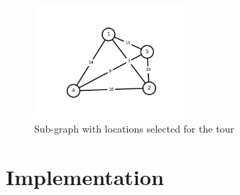 \documentclass{article}
\begin{document}
\begin{figure}[h]
  \centering
  \includegraphics[width=0.50\textwidth]{img/graphOutput.png}
  \caption{Sub-graph with locations selected for the tour}\label{fig:graphOutput.png}
\end{figure}
\clearpage
\pagebreak


\section*{Implementation}

\end{document}
